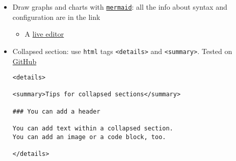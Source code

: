 \documentclass[a4paper,12pt,%
              final%
              ]{article}
\begin{document}
\begin{itemize}
  \item Draw graphs and charts with \href{https://mermaid-js.github.io/mermaid/#/}{\texttt{mermaid}}: all the info about syntax and configuration are in the link
    \begin{itemize}
      \item A \href{https://mermaid-js.github.io/mermaid-live-editor}{live editor}
    \end{itemize}
  \item Collapsed section: use \texttt{html} tags \texttt{<details>} and \texttt{<summary>}. Tested on \href{https://docs.github.com/en/get-started/writing-on-github/working-with-advanced-formatting/organizing-information-with-collapsed-sections}{GitHub}
\begin{verbatim}
<details>

<summary>Tips for collapsed sections</summary>

### You can add a header

You can add text within a collapsed section.
You can add an image or a code block, too.

</details>
\end{verbatim}
\end{itemize}

\end{document}
